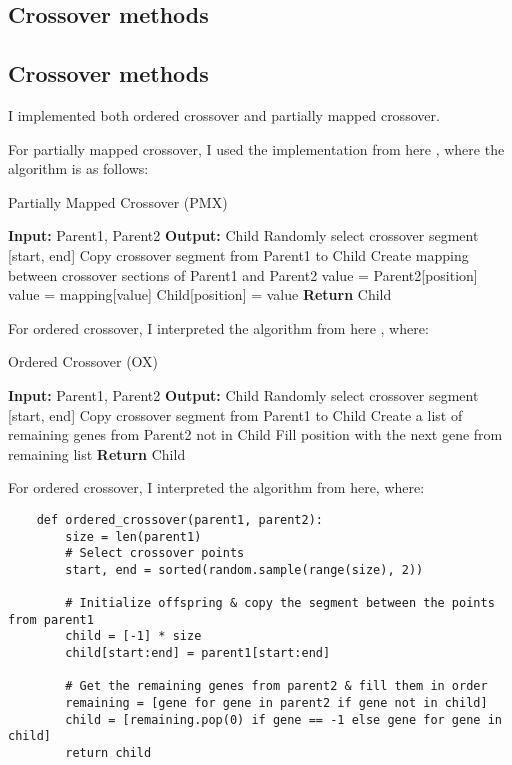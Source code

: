 \documentclass[11pt]{scrartcl} %
\begin{document}
\subsection{Crossover methods}
\subsection{Crossover methods}

I implemented both ordered crossover and partially mapped crossover. 

For partially mapped crossover, I used the implementation from here \cite{baeldung_pmx}, where the algorithm is as follows:

\begin{algorithm}
\caption{Partially Mapped Crossover (PMX)}
\begin{algorithmic}
\State \textbf{Input:} Parent1, Parent2
\State \textbf{Output:} Child
\State Randomly select crossover segment [start, end]
\State Copy crossover segment from Parent1 to Child
\State Create mapping between crossover sections of Parent1 and Parent2
        \State value = Parent2[position]
            \State value = mapping[value]
        \EndWhile
        \State Child[position] = value
    \EndIf
\EndFor
\State \textbf{Return} Child
\end{algorithmic}
\end{algorithm}

For ordered crossover, I interpreted the algorithm from here \cite{ordered_crossover_stackoverflow}, where:

\begin{algorithm}
\caption{Ordered Crossover (OX)}
\begin{algorithmic}
\State \textbf{Input:} Parent1, Parent2
\State \textbf{Output:} Child
\State Randomly select crossover segment [start, end]
\State Copy crossover segment from Parent1 to Child
\State Create a list of remaining genes from Parent2 not in Child
        \State Fill position with the next gene from remaining list
    \EndIf
\EndFor
\State \textbf{Return} Child
\end{algorithmic}
\end{algorithm}

For ordered crossover, I interpreted the algorithm from here\cite{ordered_crossover_stackoverflow}, where:
\begin{verbatim}
	def ordered_crossover(parent1, parent2):
		size = len(parent1)
		# Select crossover points
		start, end = sorted(random.sample(range(size), 2))

		# Initialize offspring & copy the segment between the points from parent1
		child = [-1] * size 
		child[start:end] = parent1[start:end]
		
		# Get the remaining genes from parent2 & fill them in order
		remaining = [gene for gene in parent2 if gene not in child] 
		child = [remaining.pop(0) if gene == -1 else gene for gene in child] 
		return child
\end{verbatim}
\end{document}
